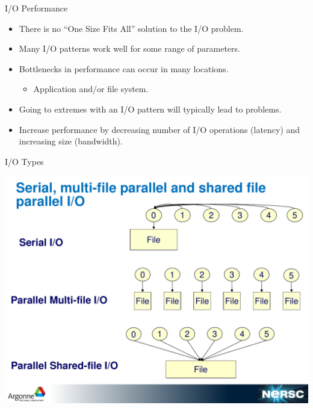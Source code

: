 \documentclass[compress,11pt,xcolor=svgnames,aspectratio=169]{beamer}
\begin{document}
\begin{frame}[t]{I/O Performance}

\begin{itemize}
\setlength\itemsep{0.4cm}

  \item There is no ``One Size Fits All'' solution to the I/O problem.

  \item Many I/O patterns work well for some range of parameters.

  \item Bottlenecks in performance can occur in many locations.

  \begin{itemize}
    \item Application and/or file system.
  \end{itemize}

  \item Going to extremes with an I/O pattern will typically lead to problems.

  \item Increase performance by decreasing number of I/O operations (latency) and increasing size (bandwidth).

\end{itemize}

\end{frame}

\begin{frame}[t]{I/O Types}

\begin{center}
\includegraphics[scale=0.3]{io-types}
\end{center}

\end{frame}
\end{document}
